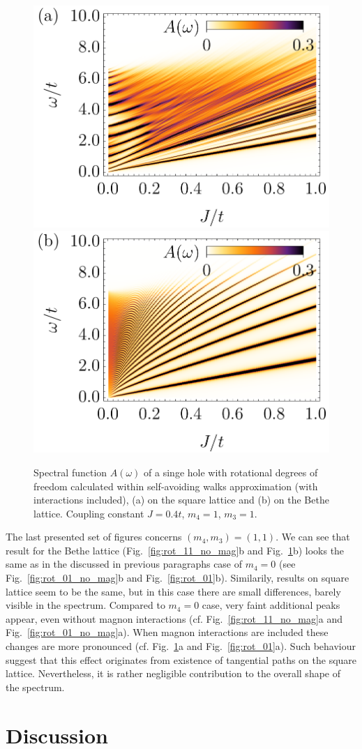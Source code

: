 \documentclass[%
 reprint,
 amsmath,amssymb,
 aps,
prb,
floatfix,
]{revtex4-1}
\begin{document}
\begin{figure}[ht!]
	\includegraphics[width=0.49\columnwidth]
	{./figures/square/[1, 1].png}
	\includegraphics[width=0.49\columnwidth]
	{./figures/bethe/[1, 1].png}
	\caption{
		Spectral function $A(\omega)$ of a singe hole with rotational degrees of freedom calculated within self-avoiding walks approximation (with interactions included), (a) on the square lattice and (b) on the Bethe lattice. Coupling constant $J=0.4t$, $m_4 = 1$, $m_3 = 1$.
	}\label{fig:rot_11}
\end{figure}

The last presented set of figures concerns $(m_4,m_3) = (1,1)$. We can see that result for the Bethe lattice (Fig.~\ref{fig:rot_11_no_mag}b and Fig.~\ref{fig:rot_11}b) looks the same as in the discussed in previous paragraphs case of $m_4 = 0$ (see Fig.~\ref{fig:rot_01_no_mag}b and Fig.~\ref{fig:rot_01}b). Similarily, results on square lattice seem to be the same, but in this case there are small differences, barely visible in the spectrum. Compared to $m_4 = 0$ case, very faint additional peaks appear, even without magnon interactions (cf. Fig.~\ref{fig:rot_11_no_mag}a and Fig.~\ref{fig:rot_01_no_mag}a). When magnon interactions are included these changes are more pronounced (cf. Fig.~\ref{fig:rot_11}a and Fig.~\ref{fig:rot_01}a). Such behaviour suggest that this effect originates from existence of tangential paths on the square lattice. Nevertheless, it is rather negligible contribution to the overall shape of the spectrum.


\section{\label{sec:discussion}Discussion}
\end{document}
